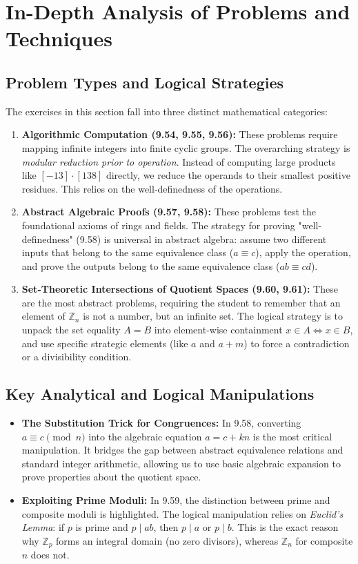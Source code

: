 \documentclass[11pt, a4paper]{article}
\theoremstyle{definition}
\theoremstyle{remark}
\newcommand{\Z}{\mathbb{Z}}
\begin{document}
\newpage
\section{In-Depth Analysis of Problems and Techniques}

\subsection{Problem Types and Logical Strategies}
The exercises in this section fall into three distinct mathematical categories:
\begin{enumerate}
    \item \textbf{Algorithmic Computation (9.54, 9.55, 9.56):} These problems require mapping infinite integers into finite cyclic groups. The overarching strategy is \textit{modular reduction prior to operation}. Instead of computing large products like $[-13] \cdot [138]$ directly, we reduce the operands to their smallest positive residues. This relies on the well-definedness of the operations.
    \item \textbf{Abstract Algebraic Proofs (9.57, 9.58):} These problems test the foundational axioms of rings and fields. The strategy for proving "well-definedness" (9.58) is universal in abstract algebra: assume two different inputs that belong to the same equivalence class ($a \equiv c$), apply the operation, and prove the outputs belong to the same equivalence class ($ab \equiv cd$).
    \item \textbf{Set-Theoretic Intersections of Quotient Spaces (9.60, 9.61):} These are the most abstract problems, requiring the student to remember that an element of $\Z_n$ is not a number, but an infinite set. The logical strategy is to unpack the set equality $A = B$ into element-wise containment $x \in A \iff x \in B$, and use specific strategic elements (like $a$ and $a+m$) to force a contradiction or a divisibility condition.
\end{enumerate}

\subsection{Key Analytical and Logical Manipulations}
\begin{itemize}
    \item \textbf{The Substitution Trick for Congruences:} In 9.58, converting $a \equiv c \pmod n$ into the algebraic equation $a = c + kn$ is the most critical manipulation. It bridges the gap between abstract equivalence relations and standard integer arithmetic, allowing us to use basic algebraic expansion to prove properties about the quotient space.
    \item \textbf{Exploiting Prime Moduli:} In 9.59, the distinction between prime and composite moduli is highlighted. The logical manipulation relies on \textit{Euclid's Lemma}: if $p$ is prime and $p \mid ab$, then $p \mid a$ or $p \mid b$. This is the exact reason why $\Z_p$ forms an integral domain (no zero divisors), whereas $\Z_n$ for composite $n$ does not.
\end{itemize}
\end{document}
